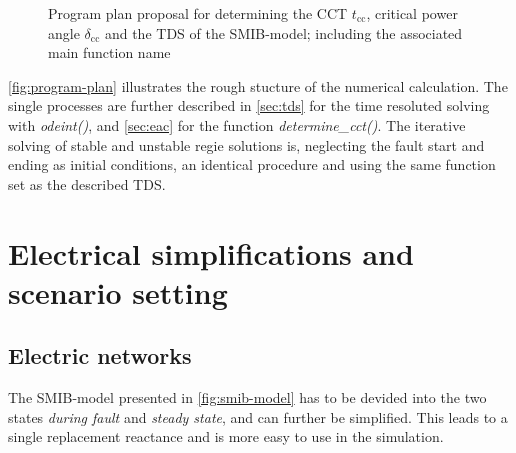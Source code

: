 \begin{figure}[h]
        \caption[Program plan proposal for determining the \acf{CCT}]{Program plan proposal for determining the \acf{CCT} $t_\mathrm{cc}$, critical power angle $\delta_\mathrm{cc}$ and the \acf{TDS} of the \acf{SMIB}-model; including the associated main function name}
        \label{fig:program-plan}
\end{figure}

\autoref{fig:program-plan} illustrates the rough stucture of the numerical calculation. The single processes are further described in \autoref{sec:tds} for the time resoluted solving with {\itshape odeint()}, and \autoref{sec:eac} for the function {\itshape determine\_cct()}. 
The iterative solving of stable and unstable regie solutions is, neglecting the fault start and ending as initial conditions, an identical procedure and using the same function set as the described \acs{TDS}.

\section{Electrical simplifications and scenario setting}
\label{sec:scenario}

\subsection{Electric networks}
\label{sec:el-networks}

The \acs{SMIB}-model presented in \autoref{fig:smib-model} has to be devided into the two states {\itshape during fault} and {\itshape steady state}, and can further be simplified. This leads to a single replacement reactance and is more easy to use in the simulation.


